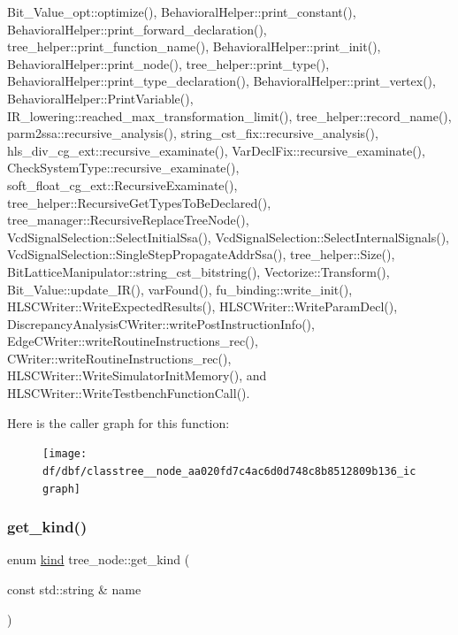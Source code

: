 Bit\+\_\+\+Value\+\_\+opt\+::optimize(), Behavioral\+Helper\+::print\+\_\+constant(), Behavioral\+Helper\+::print\+\_\+forward\+\_\+declaration(), tree\+\_\+helper\+::print\+\_\+function\+\_\+name(), Behavioral\+Helper\+::print\+\_\+init(), Behavioral\+Helper\+::print\+\_\+node(), tree\+\_\+helper\+::print\+\_\+type(), Behavioral\+Helper\+::print\+\_\+type\+\_\+declaration(), Behavioral\+Helper\+::print\+\_\+vertex(), Behavioral\+Helper\+::\+Print\+Variable(), I\+R\+\_\+lowering\+::reached\+\_\+max\+\_\+transformation\+\_\+limit(), tree\+\_\+helper\+::record\+\_\+name(), parm2ssa\+::recursive\+\_\+analysis(), string\+\_\+cst\+\_\+fix\+::recursive\+\_\+analysis(), hls\+\_\+div\+\_\+cg\+\_\+ext\+::recursive\+\_\+examinate(), Var\+Decl\+Fix\+::recursive\+\_\+examinate(), Check\+System\+Type\+::recursive\+\_\+examinate(), soft\+\_\+float\+\_\+cg\+\_\+ext\+::\+Recursive\+Examinate(), tree\+\_\+helper\+::\+Recursive\+Get\+Types\+To\+Be\+Declared(), tree\+\_\+manager\+::\+Recursive\+Replace\+Tree\+Node(), Vcd\+Signal\+Selection\+::\+Select\+Initial\+Ssa(), Vcd\+Signal\+Selection\+::\+Select\+Internal\+Signals(), Vcd\+Signal\+Selection\+::\+Single\+Step\+Propagate\+Addr\+Ssa(), tree\+\_\+helper\+::\+Size(), Bit\+Lattice\+Manipulator\+::string\+\_\+cst\+\_\+bitstring(), Vectorize\+::\+Transform(), Bit\+\_\+\+Value\+::update\+\_\+\+I\+R(), var\+Found(), fu\+\_\+binding\+::write\+\_\+init(), H\+L\+S\+C\+Writer\+::\+Write\+Expected\+Results(), H\+L\+S\+C\+Writer\+::\+Write\+Param\+Decl(), Discrepancy\+Analysis\+C\+Writer\+::write\+Post\+Instruction\+Info(), Edge\+C\+Writer\+::write\+Routine\+Instructions\+\_\+rec(), C\+Writer\+::write\+Routine\+Instructions\+\_\+rec(), H\+L\+S\+C\+Writer\+::\+Write\+Simulator\+Init\+Memory(), and H\+L\+S\+C\+Writer\+::\+Write\+Testbench\+Function\+Call().

Here is the caller graph for this function\+:
\nopagebreak
\begin{figure}[H]
\begin{center}
\leavevmode
\texttt{[image: df/dbf/classtree\_\_node\_aa020fd7c4ac6d0d748c8b8512809b136\_icgraph]}
\end{center}
\end{figure}
\mbox{\label{classtree__node_a3f68e5e4337d81e0733d231844d71a52}} 
\subsubsection{\texorpdfstring{get\+\_\+kind()}{get\_kind()}\hspace{0.1cm}{\footnotesize\ttfamily [2/2]}}
{\footnotesize\ttfamily enum \hyperlink{tree__common_8hpp_a9efbd7c7191fb190b76c2fd05d6e7b45}{kind} tree\+\_\+node\+::get\+\_\+kind (\begin{DoxyParamCaption}\item[{const std\+::string \&}]{name }\end{DoxyParamCaption})\hspace{0.3cm}{\ttfamily [static]}}



